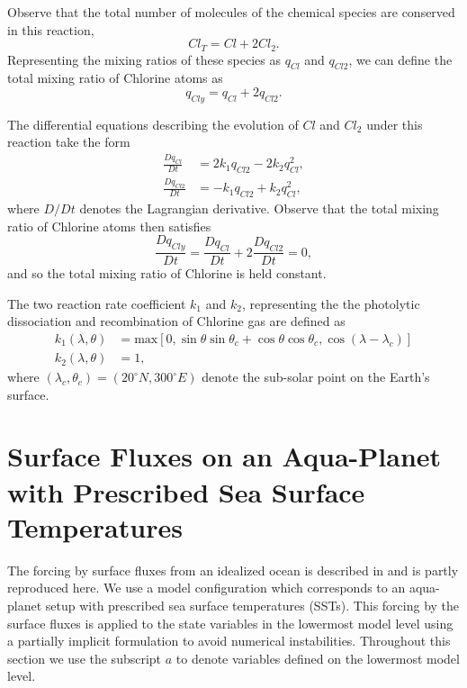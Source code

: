 \documentclass[times,doublespace]{fldauth}
\begin{document}
{\begin{appendix}
Observe that the total number of molecules of the chemical species are conserved in this reaction,
\begin{equation}
Cl_T=Cl+2 Cl_2.
\end{equation}  Representing the mixing ratios of these species as $q_{Cl}$ and $q_{Cl2}$, we can define the total mixing ratio of Chlorine atoms as
\begin{equation}
q_{Cly} = q_{Cl} + 2 q_{Cl2}.
\end{equation}

The differential equations describing the evolution of $Cl$ and $Cl_2$ under this reaction take the form
\begin{align}
\frac{Dq_{Cl}}{Dt} &= 2k_1 q_{Cl2} -2k_2 q_{Cl}^2, \\
\frac{Dq_{Cl2}}{Dt} &= -k_1 q_{Cl2} + k_2 q_{Cl}^2,
\end{align} where $D/Dt$ denotes the Lagrangian derivative.  Observe that the total mixing ratio of Chlorine atoms then satisfies
\begin{equation}
\frac{Dq_{Cly}}{Dt} = \frac{Dq_{Cl}}{Dt} + 2 \frac{Dq_{Cl2}}{Dt} = 0,
\end{equation} and so the total mixing ratio of Chlorine is held constant.

The two reaction rate coefficient  $k_1$ and $k_2$, representing the the photolytic dissociation and recombination of Chlorine gas are defined as
\begin{align}
k_1(\lambda,\theta)&= \mbox{max} \left[ 0,\sin\theta\sin\theta_c+\cos\theta\cos\theta_c, \label{app:term_k1}
\cos(\lambda-\lambda_c) \right] \\
k_2(\lambda,\theta)&=1,\label{app:term_k2}
\end{align} where $(\lambda_c, \theta_c)=(20^\circ N, 300^\circ E)$ denote the sub-solar point on the Earth's surface.


\section{Surface Fluxes on an Aqua-Planet with Prescribed Sea Surface Temperatures} \label{sec:OceanSurfaceFluxes}

The forcing by surface fluxes from an idealized ocean is described in \cite{reed2012idealized} and is partly reproduced here. We use a model configuration which corresponds to an aqua-planet setup with prescribed sea surface temperatures (SSTs). This forcing by the surface fluxes is applied to the state variables in the lowermost model level using a partially implicit formulation to avoid numerical instabilities.  Throughout this section we use the subscript $a$ to denote variables defined on the lowermost model level.


\end{appendix}}
\end{document}
